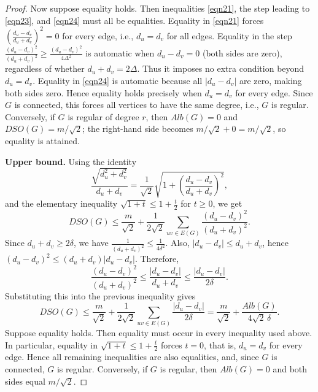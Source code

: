 \documentclass{article}
\theoremstyle{definition}
\begin{document}
\begin{proof}
Now suppose equality holds. Then inequalities \eqref{eqn21}, the step leading to \eqref{eqn23}, and \eqref{eqn24} must all be equalities.
Equality in \eqref{eqn21} forces $\left(\frac{d_u-d_v}{d_u+d_v}\right)^2=0$ for every edge, i.e., $d_u=d_v$ for all edges.
Equality in the step $ \frac{(d_u-d_v)^2}{(d_u+d_v)^2} \ge \frac{(d_u-d_v)^2}{4\Delta^2} $ is automatic when $d_u-d_v=0$ (both sides are zero), regardless of whether $d_u+d_v=2\Delta$. Thus it imposes no extra condition beyond $d_u=d_v$.
Equality in \eqref{eqn24} is automatic because all $|d_u-d_v|$ are zero, making both sides zero.
Hence equality holds precisely when $d_u=d_v$ for every edge. Since $G$ is connected, this forces all vertices to have the same degree, i.e., $G$ is regular. Conversely, if $G$ is regular of degree $r$, then $Alb(G)=0$ and $DSO(G)=m/\sqrt{2}$; the right-hand side becomes $m/\sqrt{2}+0 = m/\sqrt{2}$, so equality is attained.


\noindent
\textbf{Upper bound.}
Using the identity
\[
\frac{\sqrt{d_u^2+d_v^2}}{d_u+d_v}
= \frac{1}{\sqrt{2}}\sqrt{1+\left(\frac{d_u-d_v}{d_u+d_v}\right)^2},
\]
and the elementary inequality $\sqrt{1+t}\le 1+\frac{t}{2}$ for $t\ge0$, we get
\[
DSO(G) \le \frac{m}{\sqrt{2}} + \frac{1}{2\sqrt{2}}\sum_{uv\in E(G)} \frac{(d_u-d_v)^2}{(d_u+d_v)^2}.
\]
Since $d_u+d_v \ge 2\delta$, we have $\frac{1}{(d_u+d_v)^2} \le \frac{1}{4\delta^2}$. Also, $|d_u-d_v| \le d_u+d_v$, hence $(d_u-d_v)^2 \le (d_u+d_v)|d_u-d_v|$. Therefore,
\[
\frac{(d_u-d_v)^2}{(d_u+d_v)^2} \le \frac{|d_u-d_v|}{d_u+d_v} \le \frac{|d_u-d_v|}{2\delta}.
\]
Substituting this into the previous inequality gives
\[
DSO(G) \le \frac{m}{\sqrt{2}} + \frac{1}{2\sqrt{2}}\sum_{uv\in E(G)} \frac{|d_u-d_v|}{2\delta}
= \frac{m}{\sqrt{2}} + \frac{Alb(G)}{4\sqrt{2}\,\delta}.
\]
Suppose equality holds.
Then equality must occur in every inequality used above.
In particular, equality in
$
\sqrt{1+t}\le1+\frac t2
$
forces
$t=0$,
that is,
$d_u=d_v$
for every edge.
Hence all remaining inequalities are also equalities,
and, since $G$ is connected,
$G$ is regular.
Conversely, if $G$ is regular, then $Alb(G)=0$ and both sides equal $m/\sqrt{2}$.
\end{proof}
\end{document}
